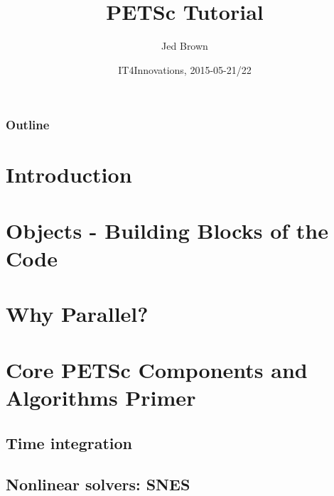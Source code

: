 \documentclass{beamer}
\title[http://59A2.org/files/201505-IT4IPETSc.pdf]{PETSc Tutorial}
\author{Jed Brown}
\institute[CU/ANL]{CU Boulder and Argonne National Laboratory}
\date{IT4Innovations, 2015-05-21/22}
\begin{document}
\lstset{language=C}

\begin{frame}
  \titlepage
\end{frame}

\begin{frame}
\frametitle{Outline}
\tableofcontents
\end{frame}


\section{Introduction}










\section{Objects - Building Blocks of the Code}



\section{Why Parallel?}


\section[Core/Algorithms]{Core PETSc Components and Algorithms Primer}
\subsection{Time integration}





\subsection{Nonlinear solvers: SNES}




\end{document}
